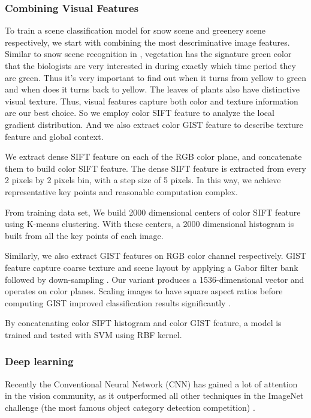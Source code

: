\subsubsection{Combining Visual Features}
To train a scene classification model for snow scene and greenery scene respectively, we start with 
combining the most descriminative image features. Similar to snow scene recognition in , 
vegetation has the signature green color that the  
biologists are very interested in during exactly which time period they are green. 
Thus it's very important 
to find out when it turns from yellow to green and when does it turns back to yellow.
The leaves of plants also have distinctive visual texture. 
Thus, visual features capture both color and texture information are our best choice.
So we employ color SIFT feature  to analyze the local gradient distribution. 
And we also extract color GIST feature to describe texture feature and global context. 

We extract dense SIFT feature on each of the RGB color plane, and concatenate them to 
build color SIFT feature. The dense SIFT feature is extracted from every 2 pixels by 2 pixels bin, 
with a step size of 5 pixels. In this way, we achieve representative key points and reasonable 
computation complex. 

From training data set, We build 2000 dimensional centers of color SIFT feature 
using K-means clustering. With these centers, a 2000 dimensional histogram is built 
from all the key points of each image.

 Similarly, we also extract GIST features on RGB color channel respectively.
GIST feature capture coarse texture
and scene layout by applying a Gabor filter bank followed by
down-sampling . Our variant produces a
1536-dimensional vector and operates on color planes. Scaling
images to have square aspect ratios before computing GIST improved
classification results significantly .

By concatenating color SIFT histogram and color GIST feature, 
a model is trained and tested with SVM using RBF kernel.

\subsubsection{Deep learning}
Recently the Conventional Neural Network (CNN) 
has gained a lot of attention 
in the vision community, as it outperformed all other techniques in the ImageNet challenge 
(the most famous object category detection competition) .

